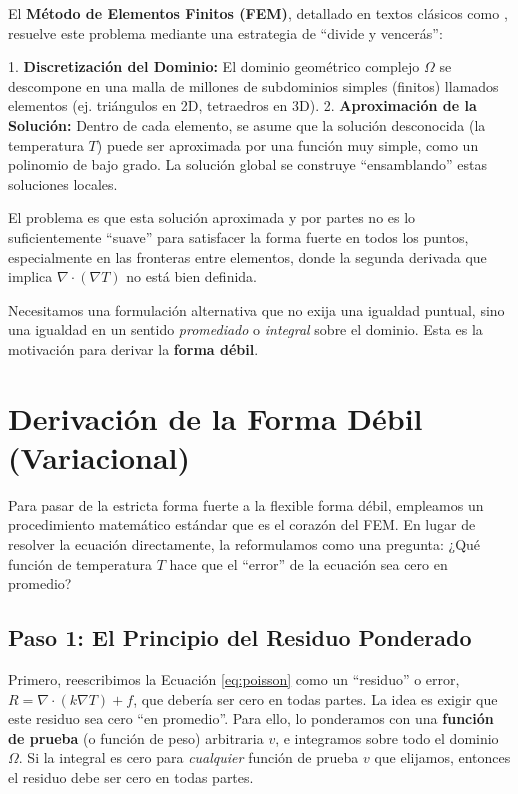 \documentclass[11pt, a4paper]{article}
\begin{document}
El \textbf{Método de Elementos Finitos (FEM)}, detallado en textos clásicos como \cite{zienkiewicz2013}, resuelve este problema mediante una estrategia de ``divide y vencerás'':

1.  \textbf{Discretización del Dominio:} El dominio geométrico complejo $\Omega$ se descompone en una malla de millones de subdominios simples (finitos) llamados elementos (ej. triángulos en 2D, tetraedros en 3D).
2.  \textbf{Aproximación de la Solución:} Dentro de cada elemento, se asume que la solución desconocida (la temperatura $T$) puede ser aproximada por una función muy simple, como un polinomio de bajo grado. La solución global se construye ``ensamblando'' estas soluciones locales.

El problema es que esta solución aproximada y por partes no es lo suficientemente ``suave'' para satisfacer la forma fuerte en todos los puntos, especialmente en las fronteras entre elementos, donde la segunda derivada que implica $\nabla \cdot (\nabla T)$ no está bien definida.

Necesitamos una formulación alternativa que no exija una igualdad puntual, sino una igualdad en un sentido \textit{promediado} o \textit{integral} sobre el dominio. Esta es la motivación para derivar la \textbf{forma débil}.

\section{Derivación de la Forma Débil (Variacional)}
\label{sec:debil}
Para pasar de la estricta forma fuerte a la flexible forma débil, empleamos un procedimiento matemático estándar que es el corazón del FEM. En lugar de resolver la ecuación directamente, la reformulamos como una pregunta: ¿Qué función de temperatura $T$ hace que el ``error'' de la ecuación sea cero en promedio?

\subsection{Paso 1: El Principio del Residuo Ponderado}
Primero, reescribimos la Ecuación \ref{eq:poisson} como un ``residuo'' o error, $R = \nabla \cdot (k \nabla T) + f$, que debería ser cero en todas partes. La idea es exigir que este residuo sea cero ``en promedio''. Para ello, lo ponderamos con una \textbf{función de prueba} (o función de peso) arbitraria $v$, e integramos sobre todo el dominio $\Omega$. Si la integral es cero para \textit{cualquier} función de prueba $v$ que elijamos, entonces el residuo debe ser cero en todas partes.
\end{document}
